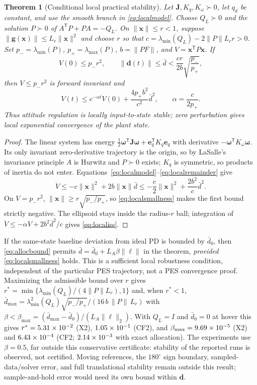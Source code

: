 \documentclass[letterpaper, 10 pt, conference]{ieeeconf}
\newtheorem{theorem}{Theorem}
\newcommand{\T}{^{\mathsf T}}
\begin{document}
\begin{theorem}[Conditional local practical stability]
\label{thm:local}
Let $\bm J,K_q,K_\omega\succ0$, let $q_d$ be constant, and use the smooth
branch in \eqref{eq:localmodel}. Choose $Q_L\succ0$ and the solution
$P\succ0$ of $A\T P+PA=-Q_L$. On $\|\bm x\|\le r<1$, suppose
$\|\bm g(\bm x)\|\le L_r\|\bm x\|^2$ and choose $r$ so that
$c=\lambda_{\min}(Q_L)-2\|P\|L_r r>0$.
Set $p_- =\lambda_{\min}(P)$, $p_+=\lambda_{\max}(P)$,
$b=\|PF\|$, and $V=\bm x\T P\bm x$. If
\begin{equation}
 V(0)\le p_-r^2,\qquad
 \|\bm d(t)\|\le\bar d<\frac{cr}{2b}\sqrt{\frac{p_-}{p_+}},
 \label{eq:localsmallness}
\end{equation}
then $V\le p_-r^2$ is forward invariant and
\begin{equation}
 V(t)\le e^{-\alpha t}V(0)+\frac{4p_+b^2}{c^2}\bar d^2,
 \qquad \alpha=\frac{c}{2p_+}.
 \label{eq:localiss}
\end{equation}
Thus attitude regulation is locally input-to-state stable; zero
perturbation gives local exponential convergence of the plant state.
\end{theorem}
\begin{proof}
The linear system has energy
$\frac12\bm\omega\T\bm J\bm\omega+\bm e_q\T K_q\bm e_q$ with derivative
$-\bm\omega\T K_\omega\bm\omega$. Its only invariant zero-derivative
trajectory is the origin, so by LaSalle's invariance principle
\cite{khalil2002nonlinear} $A$ is Hurwitz and $P\succ0$ exists; $K_q$ is symmetric, so products
of inertia do not enter.
Equations~\eqref{eq:localmodel}--\eqref{eq:localremainder} give
\[
 \dot V\le-c\|\bm x\|^2+2b\|\bm x\|\bar d
 \le-\frac c2\|\bm x\|^2+\frac{2b^2}{c}\bar d^2.
\]
On $V=p_-r^2$, $\|\bm x\|\ge r\sqrt{p_-/p_+}$, so
\eqref{eq:localsmallness} makes the first bound strictly negative.
The ellipsoid stays inside the radius-$r$ ball; integration of
$\dot V\le-\alpha V+2b^2\bar d^2/c$ gives \eqref{eq:localiss}.
\end{proof}

If the same-state baseline deviation from ideal PD is bounded by $\bar d_0$,
then \eqref{eq:allocbound} permits
$\bar d=\bar d_0+L_A\beta\|\bm\ell\|$ in the theorem, \emph{provided}
\eqref{eq:localsmallness} holds. This is a sufficient local robustness
condition, independent of the particular PES trajectory, not a PES
convergence proof. Maximizing the admissible bound over $r$ gives
$r^*=\min\{\lambda_{\min}(Q_L)/(4\|P\|L_r),1\}$ and, when $r^*<1$,
$\bar d_{\max}=\lambda_{\min}^2(Q_L)\sqrt{p_-/p_+}/(16\,b\,\|P\|\,L_r)$ with
$\beta<\beta_{\max}=(\bar d_{\max}-\bar d_0)/(L_A\|\bm\ell\|_2)$. With $Q_L=I$ and
$\bar d_0=0$ at hover this gives $r^*=5.31\times10^{-2}$ (X2), $1.05\times10^{-1}$ (CF2), and
$\beta_{\max}=9.69\times10^{-5}$ (X2) and $6.43\times10^{-4}$ (CF2;
$2.14\times10^{-3}$ with exact allocation). The experiments use $\beta=0.5$, far outside this
conservative certificate: stability of the reported runs is observed, not certified. Moving references, the $180^\circ$
sign boundary, sampled-data/solver error, and full translational stability
remain outside this result; sample-and-hold error would need its own
bound within $\bm d$.
\end{document}
